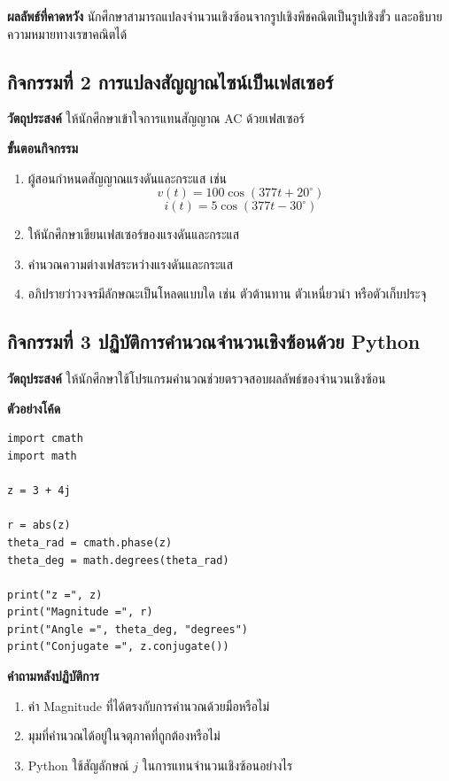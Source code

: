 \textbf{ผลลัพธ์ที่คาดหวัง}  
นักศึกษาสามารถแปลงจำนวนเชิงซ้อนจากรูปเชิงพีชคณิตเป็นรูปเชิงขั้ว และอธิบายความหมายทางเรขาคณิตได้

\subsection{กิจกรรมที่ 2 การแปลงสัญญาณไซน์เป็นเฟสเซอร์}

\textbf{วัตถุประสงค์}  
ให้นักศึกษาเข้าใจการแทนสัญญาณ AC ด้วยเฟสเซอร์

\textbf{ขั้นตอนกิจกรรม}

\begin{enumerate}
\item ผู้สอนกำหนดสัญญาณแรงดันและกระแส เช่น
\[
v(t)=100\cos(377t+20^\circ)
\]
\[
i(t)=5\cos(377t-30^\circ)
\]
\item ให้นักศึกษาเขียนเฟสเซอร์ของแรงดันและกระแส
\item คำนวณความต่างเฟสระหว่างแรงดันและกระแส
\item อภิปรายว่าวงจรมีลักษณะเป็นโหลดแบบใด เช่น ตัวต้านทาน ตัวเหนี่ยวนำ หรือตัวเก็บประจุ
\end{enumerate}

\subsection{กิจกรรมที่ 3 ปฏิบัติการคำนวณจำนวนเชิงซ้อนด้วย Python}

\textbf{วัตถุประสงค์}  
ให้นักศึกษาใช้โปรแกรมคำนวณช่วยตรวจสอบผลลัพธ์ของจำนวนเชิงซ้อน

\textbf{ตัวอย่างโค้ด}

\begin{lstlisting}[style=pythonstyle]
import cmath
import math

z = 3 + 4j

r = abs(z)
theta_rad = cmath.phase(z)
theta_deg = math.degrees(theta_rad)

print("z =", z)
print("Magnitude =", r)
print("Angle =", theta_deg, "degrees")
print("Conjugate =", z.conjugate())
\end{lstlisting}

\textbf{คำถามหลังปฏิบัติการ}

\begin{enumerate}
\item ค่า Magnitude ที่ได้ตรงกับการคำนวณด้วยมือหรือไม่
\item มุมที่คำนวณได้อยู่ในจตุภาคที่ถูกต้องหรือไม่
\item Python ใช้สัญลักษณ์ $j$ ในการแทนจำนวนเชิงซ้อนอย่างไร
\end{enumerate}

